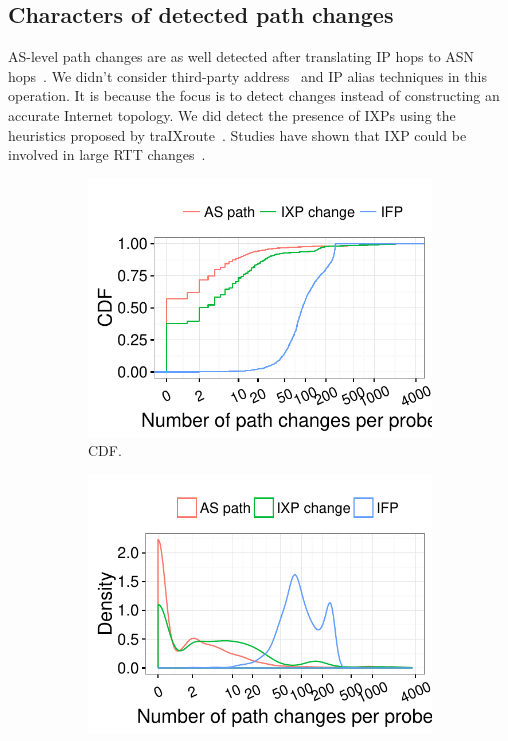 \subsection{Characters of detected path changes}
AS-level path changes are as well detected after translating IP hops to ASN hops~\cite{routeviews}.
We didn't consider third-party address~\cite{Hyun2003, Zhang2010} and IP alias techniques\cite{Gunes2009,Keys2010a} in this operation.
It is because the focus is to detect changes instead of constructing an accurate Internet topology.
We did detect the presence of IXPs using the heuristics proposed by traIXroute~\cite{Nomikos2016}.
Studies have shown that IXP could be involved in large RTT changes~\cite{kopp2016}.

\begin{figure}[!htb]
    \centering
    \begin{subfigure}[b]{.48\textwidth}
	\centering
	\includegraphics[width=\textwidth]{gfx/chap4/path_ch_count_cdf_cmp.pdf}
	\caption{\footnotesize CDF.}
	\label{fig:path_ch_count_cdf_cmp}
	\end{subfigure}
	\begin{subfigure}[b]{.48\textwidth}
	\centering
	\includegraphics[width=\textwidth]{gfx/chap4/path_ch_count_density_cmp.pdf}

\end{subfigure}
\end{figure}
